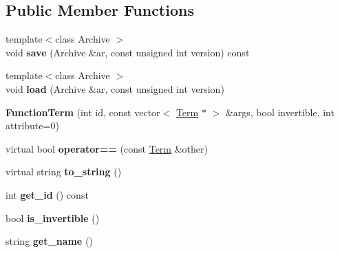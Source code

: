 \subsection*{\-Public \-Member \-Functions}
\begin{DoxyCompactItemize}
\item 
\hypertarget{classFunctionTerm_a5d4e3e694d75d8431e7bf55092c37ce7}{{\footnotesize template$<$class Archive $>$ }\\void {\bfseries save} (\-Archive \&ar, const unsigned int version) const }\label{classFunctionTerm_a5d4e3e694d75d8431e7bf55092c37ce7}

\item 
\hypertarget{classFunctionTerm_a413d70e30ff5d361d676a13bd510224d}{{\footnotesize template$<$class Archive $>$ }\\void {\bfseries load} (\-Archive \&ar, const unsigned int version)}\label{classFunctionTerm_a413d70e30ff5d361d676a13bd510224d}

\item 
\hypertarget{classFunctionTerm_aea5a9451a9a792e9740ad7a655788610}{{\bfseries \-Function\-Term} (int id, const vector$<$ \hyperlink{classTerm}{\-Term} $\ast$ $>$ \&args, bool invertible, int attribute=0)}\label{classFunctionTerm_aea5a9451a9a792e9740ad7a655788610}

\item 
\hypertarget{classFunctionTerm_a16f50617f09e608064c08ea88ec12f10}{virtual bool {\bfseries operator==} (const \hyperlink{classTerm}{\-Term} \&other)}\label{classFunctionTerm_a16f50617f09e608064c08ea88ec12f10}

\item 
\hypertarget{classFunctionTerm_ae6cadfbb98234e9422e9e07240e6044a}{virtual string {\bfseries to\-\_\-string} ()}\label{classFunctionTerm_ae6cadfbb98234e9422e9e07240e6044a}

\item 
\hypertarget{classFunctionTerm_a1b81d3b0dd552eef335f6e12087bf5d0}{int {\bfseries get\-\_\-id} () const }\label{classFunctionTerm_a1b81d3b0dd552eef335f6e12087bf5d0}

\item 
\hypertarget{classFunctionTerm_a22fec1cbe07e0314fed0b388f37bd7c8}{bool {\bfseries is\-\_\-invertible} ()}\label{classFunctionTerm_a22fec1cbe07e0314fed0b388f37bd7c8}

\item 
\hypertarget{classFunctionTerm_ae527a349c1f27676e9d8c95129ba0630}{string {\bfseries get\-\_\-name} ()}\label{classFunctionTerm_ae527a349c1f27676e9d8c95129ba0630}


\end{DoxyCompactItemize}
